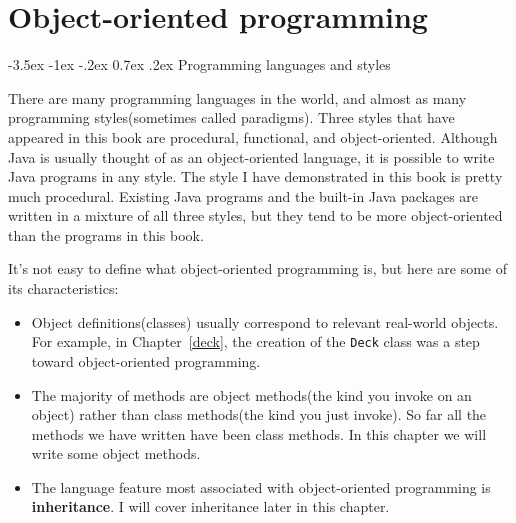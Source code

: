 \documentclass{book}
\makeatletter
\newcounter{exercisenum}
\renewcommand{\section}{\@startsection 
    {section} {1} {0mm}%
    {-3.5ex \@plus -1ex \@minus -.2ex}%
    {0.7ex \@plus.2ex}%
    {\normalfont\Large\bfseries}}
\newcommand{\clearemptydoublepage}{\newpage{\pagestyle{empty}\cleardoublepage}}
\newcommand{\beforechapter}{
    \cleardoublepage 
    \setcounter{exercisenum}{0}
}
\makeatother
\begin{document}
\beforechapter
\label{chap13}
\chapter{Object-oriented programming}

\section{Programming languages and styles}

There are many programming languages in the world, and almost as many
programming styles(sometimes called paradigms).  Three styles that
have appeared in this book are procedural, functional, and
object-oriented.  Although Java is usually thought of as an
object-oriented language, it is possible to write Java programs in any
style.  The style I have demonstrated in this book is pretty much
procedural.  Existing Java programs and the built-in Java packages are
written in a mixture of all three styles, but they tend to be more
object-oriented than the programs in this book.

It's not easy to define what object-oriented programming is,
but here are some of its characteristics:

\begin{itemize}

\item Object definitions(classes) usually correspond to 
relevant real-world objects.  For example, in Chapter~\ref{deck},
the creation of the {\tt Deck} class was a step toward object-oriented
programming.

\item The majority of methods are object methods(the kind you
invoke on an object) rather than class methods(the kind you just
invoke).  So far all the methods we have written have been class
methods.  In this chapter we will write some object methods.

\item The language feature most associated with object-oriented
programming is {\bf inheritance}.  I will cover inheritance later in
this chapter.

\end{itemize}

\end{document}
